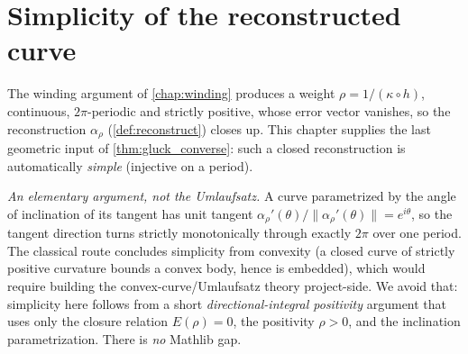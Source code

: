 \chapter{Simplicity of the reconstructed curve}
\label{chap:simplicity}


The winding argument of \cref{chap:winding} produces a weight $\rho =
1/(\kappa\circ h)$, continuous, $2\pi$-periodic and strictly positive, whose
error vector vanishes, so the reconstruction $\alpha_\rho$ (\cref{def:reconstruct})
closes up. This chapter supplies the last geometric input of
\cref{thm:gluck_converse}: such a closed reconstruction is automatically
\emph{simple} (injective on a period).

\medskip

\noindent\emph{An elementary argument, not the Umlaufsatz.} A curve
parametrized by the angle of inclination of its tangent has unit tangent
$\alpha_\rho'(\theta)/\lVert\alpha_\rho'(\theta)\rVert = e^{i\theta}$, so the
tangent direction turns strictly monotonically through exactly $2\pi$ over one
period. The classical route concludes simplicity from convexity (a closed curve
of strictly positive curvature bounds a convex body, hence is embedded), which
would require building the convex-curve/Umlaufsatz theory project-side. We avoid
that: simplicity here follows from a short \emph{directional-integral positivity}
argument that uses only the closure relation $E(\rho)=0$, the positivity
$\rho>0$, and the inclination parametrization. There is \emph{no} Mathlib gap.

